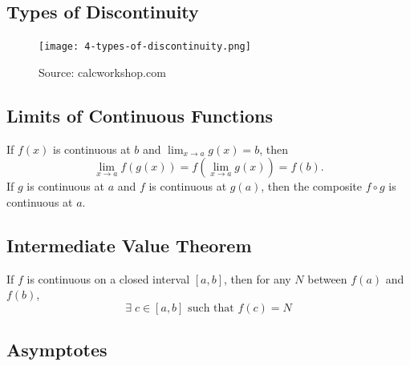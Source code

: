 \documentclass[a4paper,11pt]{article}
\theoremstyle{definition}
\theoremstyle{plain}
\theoremstyle{remark}
\begin{document}


\subsection{Types of Discontinuity}

\begin{figure}[htbp]
    \centering
    \texttt{[image: 4-types-of-discontinuity.png]} 
    \caption{Source: calcworkshop.com}
    \label{fig:discontinuity}
\end{figure}



\subsection{Limits of Continuous Functions}

\begin{tcolorbox}
    If \( f(x) \) is continuous at \( b \) and \( \displaystyle \lim_{x \to a} g(x) = b \),  then
    \[ \lim_{x \to a} f(g(x)) = f( \lim_{x \to a} g(x) ) = f(b). \]
    \tcblower
    If \( g \) is continuous at \( a \) and \( f \) is continuous at \( g(a) \), then the composite \( f \circ g \) is continuous at \( a \).
\end{tcolorbox}




\subsection{Intermediate Value Theorem}

\begin{tcolorbox}
    If \( f \) is continuous on a closed interval \( [a, b] \), then for any \( N \) between \( f(a) \) and \( f(b) \),  
    \[
    \exists \; c \in [a,b] \text{ such that } f(c) = N
    \]
\end{tcolorbox}




\subsection{Asymptotes}
\end{document}
